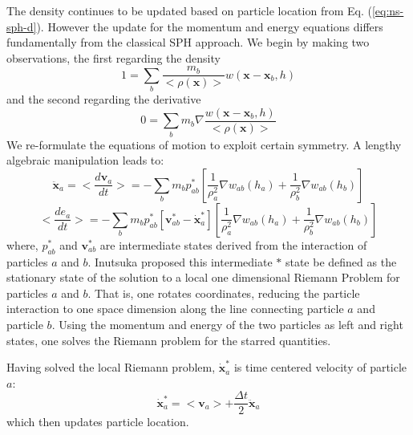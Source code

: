 The density continues to be updated based on particle location from Eq. (\ref{eq:ns-sph-d}). However the update for the momentum and energy equations differs fundamentally from the classical SPH approach. We begin by making two observations, the first regarding the density
\begin{equation}
1=\sum_{b} \frac{m_{b}}{<\rho(\textbf{x})>}w(\textbf{x} - \textbf{x}_{b}, h)
\label{eq:GSPH-basic1}
\end{equation}
and the second regarding the derivative 
\begin{equation}
0=\sum_{b} m_{b} \nabla \frac{w(\textbf{x} - \textbf{x}_{b}, h)}{<\rho(\textbf{x})>}
\label{eq:GSPH-basic2}
\end{equation}
We re-formulate the equations of motion to exploit certain symmetry. A lengthy algebraic manipulation \citep{inutsuka2002reformulation,iwasaki2011smoothed} leads to:
\begin{equation}
\ddot{\textbf{x}}_{a} = <\dfrac{d \textbf{v}_{a}}{dt}>= -\sum_{b} m_{b} p_{a b}^{\ast} \left[\frac{1}{\rho_{a}^2} \nabla w_{a b}(h_{a}) + \frac{1}{\rho_{b}^2} \nabla w_{a b}(h_{b}) \right]
\label{eq:gov-gsph-v-simple-form}
\end{equation}
\begin{equation}
<\dfrac{d e_{a}}{dt}>= - \sum_{b} m_{b} p_{a b}^{\ast} [\textbf{v}_{a b}^{\ast} - \dot{\textbf{x}}_{a}^{\ast}] \left[\frac{1}{\rho_{a}^2} \nabla w_{a b}(h_{a}) + \frac{1}{\rho_{b}^2} \nabla w_{a b}(h_{b}) \right]
\label{eq:gov-gsph-e-simple-form}
\end{equation}
where, $p_{a b}^{\ast}$ and $\textbf{v}_{a b}^{\ast}$ are intermediate states derived from the interaction of particles $a$ and $b$. Inutsuka proposed this intermediate $\ast$ state be defined as the stationary state of the solution to a local one dimensional Riemann Problem for particles $a$ and $b$.  That is, one rotates coordinates, reducing the particle interaction to one space dimension along the line connecting particle $a$ and particle $b$. Using the momentum and energy of the two particles as left and right states, one solves the Riemann problem for the starred quantities.

Having solved the local Riemann problem, 
$\dot{\textbf{x}}_{a}^{\ast}$ is time centered velocity of particle $a$:
\begin{equation}
\dot{\textbf{x}}_{a}^{\ast} = <\textbf{v}_{a}> + \frac{\Delta t}{2} \ddot{\textbf{x}}_{a}
\end{equation}
which then updates particle location.

